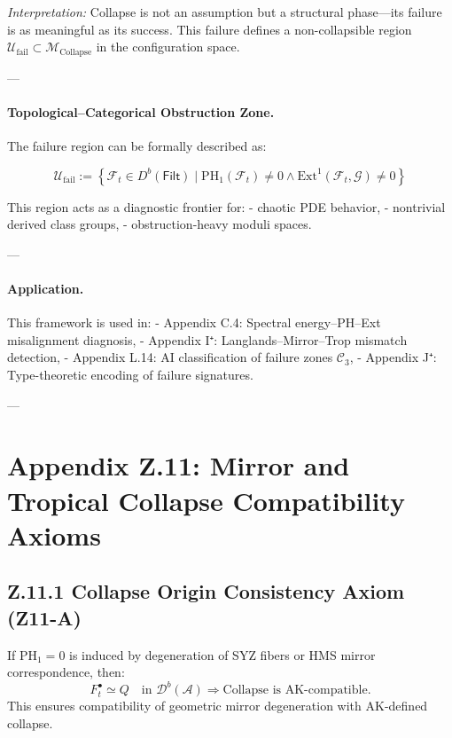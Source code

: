 \documentclass[11pt]{article}
\begin{document}
\begin{axiom}
\begin{axiom}
{{\textit{Interpretation:} Collapse is not an assumption but a structural phase—its failure is as meaningful as its success.  
This failure defines a non-collapsible region \( \mathcal{U}_{\text{fail}} \subset \mathcal{M}_{\text{Collapse}} \) in the configuration space.

---

\paragraph{Topological–Categorical Obstruction Zone.}

The failure region can be formally described as:

\[
\mathcal{U}_{\text{fail}} := \left\{ \mathcal{F}_t \in D^b(\mathsf{Filt}) \mid \mathrm{PH}_1(\mathcal{F}_t) \ne 0 \land \mathrm{Ext}^1(\mathcal{F}_t, \mathcal{G}) \ne 0 \right\}
\]

This region acts as a diagnostic frontier for:
- chaotic PDE behavior,
- nontrivial derived class groups,
- obstruction-heavy moduli spaces.

---

\paragraph{Application.}  
This framework is used in:
- Appendix C.4: Spectral energy–PH–Ext misalignment diagnosis,
- Appendix I⁺: Langlands–Mirror–Trop mismatch detection,
- Appendix L.14: AI classification of failure zones \( \mathcal{C}_3 \),
- Appendix J⁺: Type-theoretic encoding of failure signatures.

---

\section*{Appendix Z.11: Mirror and Tropical Collapse Compatibility Axioms}

\subsection*{Z.11.1 Collapse Origin Consistency Axiom (Z11-A)}
If \( \mathrm{PH}_1 = 0 \) is induced by degeneration of SYZ fibers or HMS mirror correspondence, then:
\[
F_t^\bullet \simeq Q \quad \text{in } \mathcal{D}^b(\mathcal{A}) \Rightarrow \text{Collapse is AK-compatible}.
\]
This ensures compatibility of geometric mirror degeneration with AK-defined collapse.

}}
\end{axiom}
\end{axiom}
\end{document}
